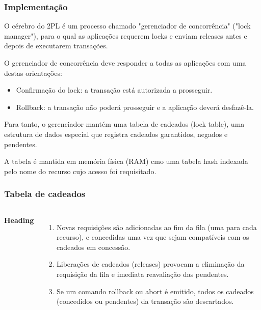 \documentclass{beamer}
\begin{document}
\begin{frame}
\frametitle{Implementação}

O cérebro do 2PL é um processo chamado "gerenciador de concorrência" ("lock manager"), para o qual as aplicações requerem locks e enviam releases antes e depois de executarem transações.

O gerenciador de concorrência deve responder a todas as aplicações com uma destas orientações:

\begin{itemize}
    \item Confirmação do lock: a transação está autorizada a prosseguir.
    \item Rollback: a transação não poderá prosseguir e a aplicação deverá desfazê-la.
\end{itemize}

Para tanto, o gerenciador mantém uma tabela de cadeados (lock table), uma estrutura de dados especial que registra cadeados garantidos, negados e pendentes.

A tabela é mantida em memória física (RAM) cmo uma tabela hash indexada pelo nome do recurso cujo acesso foi requisitado.
\end{frame}



\begin{frame}
    \frametitle{Tabela de cadeados}
    \begin{columns}[c] %
    
    
    
        \textbf{Heading}
        \begin{enumerate}
        \item Novas requisições são adicionadas ao fim da fila (uma para cada recurso), e concedidas uma vez que sejam compatíveis com os cadeados em concessão.
        \item Liberações de cadeados (releases) provocam a eliminação da requisição da fila e imediata reavaliação das pendentes.
        \item Se um comando rollback ou abort é emitido, todos os cadeados (concedidos ou pendentes) da transação são descartados.
        \end{enumerate}
        \end{columns}
\end{frame}
\end{document}
